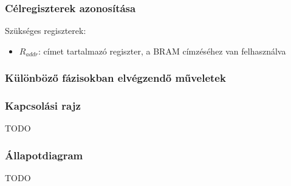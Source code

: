 \subsubsection{Célregiszterek azonosítása}

\tab Szükséges regiszterek:
\begin{itemize}
	\item $R_{addr}$: címet tartalmazó regiszter, a BRAM címzéséhez van felhasználva
\end{itemize}


\subsubsection{Különböző fázisokban elvégzendő műveletek}



\subsubsection{Kapcsolási rajz}

TODO

\subsubsection{Állapotdiagram}

TODO